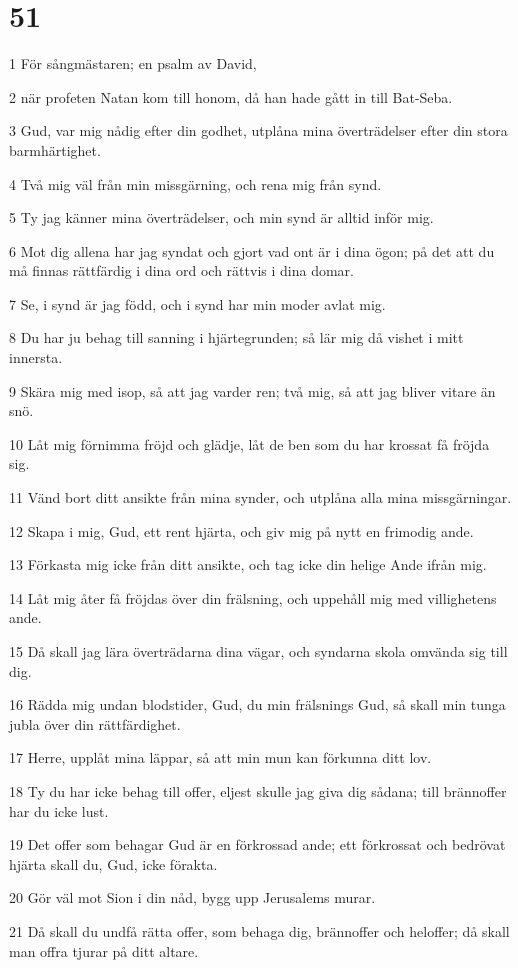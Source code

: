 \chapter{51}

\par 1 För sångmästaren; en psalm av David,
\par 2 när profeten Natan kom till honom, då han hade gått in till Bat-Seba.
\par 3 Gud, var mig nådig efter din godhet, utplåna mina överträdelser efter din stora barmhärtighet.
\par 4 Två mig väl från min missgärning, och rena mig från synd.
\par 5 Ty jag känner mina överträdelser, och min synd är alltid inför mig.
\par 6 Mot dig allena har jag syndat och gjort vad ont är i dina ögon; på det att du må finnas rättfärdig i dina ord och rättvis i dina domar.
\par 7 Se, i synd är jag född, och i synd har min moder avlat mig.
\par 8 Du har ju behag till sanning i hjärtegrunden; så lär mig då vishet i mitt innersta.
\par 9 Skära mig med isop, så att jag varder ren; två mig, så att jag bliver vitare än snö.
\par 10 Låt mig förnimma fröjd och glädje, låt de ben som du har krossat få fröjda sig.
\par 11 Vänd bort ditt ansikte från mina synder, och utplåna alla mina missgärningar.
\par 12 Skapa i mig, Gud, ett rent hjärta, och giv mig på nytt en frimodig ande.
\par 13 Förkasta mig icke från ditt ansikte, och tag icke din helige Ande ifrån mig.
\par 14 Låt mig åter få fröjdas över din frälsning, och uppehåll mig med villighetens ande.
\par 15 Då skall jag lära överträdarna dina vägar, och syndarna skola omvända sig till dig.
\par 16 Rädda mig undan blodstider, Gud, du min frälsnings Gud, så skall min tunga jubla över din rättfärdighet.
\par 17 Herre, upplåt mina läppar, så att min mun kan förkunna ditt lov.
\par 18 Ty du har icke behag till offer, eljest skulle jag giva dig sådana; till brännoffer har du icke lust.
\par 19 Det offer som behagar Gud är en förkrossad ande; ett förkrossat och bedrövat hjärta skall du, Gud, icke förakta.
\par 20 Gör väl mot Sion i din nåd, bygg upp Jerusalems murar.
\par 21 Då skall du undfå rätta offer, som behaga dig, brännoffer och heloffer; då skall man offra tjurar på ditt altare.

